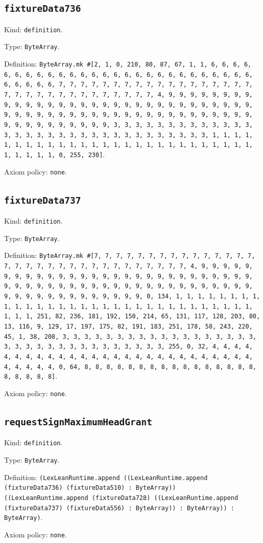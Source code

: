 \documentclass[11pt]{article}
\begin{document}
\subsection*{\texttt{fixtureData736}}
\noindent Kind: \texttt{definition}.\par
\noindent Type: \texttt{ByteArray}.\par
\noindent Definition: \texttt{ByteArray.mk \#[2, 1, 0, 210, 80, 87, 67, 1, 1, 6, 6, 6, 6, 6, 6, 6, 6, 6, 6, 6, 6, 6, 6, 6, 6, 6, 6, 6, 6, 6, 6, 6, 6, 6, 6, 6, 6, 6, 6, 6, 6, 7, 7, 7, 7, 7, 7, 7, 7, 7, 7, 7, 7, 7, 7, 7, 7, 7, 7, 7, 7, 7, 7, 7, 7, 7, 7, 7, 7, 7, 7, 7, 7, 4, 9, 9, 9, 9, 9, 9, 9, 9, 9, 9, 9, 9, 9, 9, 9, 9, 9, 9, 9, 9, 9, 9, 9, 9, 9, 9, 9, 9, 9, 9, 9, 9, 9, 9, 9, 9, 9, 9, 9, 9, 9, 9, 9, 9, 9, 9, 9, 9, 9, 9, 9, 9, 9, 9, 9, 9, 9, 9, 9, 9, 9, 9, 9, 9, 3, 3, 3, 3, 3, 3, 3, 3, 3, 3, 3, 3, 3, 3, 3, 3, 3, 3, 3, 3, 3, 3, 3, 3, 3, 3, 3, 3, 3, 3, 3, 3, 1, 1, 1, 1, 1, 1, 1, 1, 1, 1, 1, 1, 1, 1, 1, 1, 1, 1, 1, 1, 1, 1, 1, 1, 1, 1, 1, 1, 1, 1, 1, 1, 0, 255, 230]}.\par
\noindent Axiom policy: \texttt{none}.\par
\subsection*{\texttt{fixtureData737}}
\noindent Kind: \texttt{definition}.\par
\noindent Type: \texttt{ByteArray}.\par
\noindent Definition: \texttt{ByteArray.mk \#[7, 7, 7, 7, 7, 7, 7, 7, 7, 7, 7, 7, 7, 7, 7, 7, 7, 7, 7, 7, 7, 7, 7, 7, 7, 7, 7, 7, 7, 7, 7, 7, 4, 9, 9, 9, 9, 9, 9, 9, 9, 9, 9, 9, 9, 9, 9, 9, 9, 9, 9, 9, 9, 9, 9, 9, 9, 9, 9, 9, 9, 9, 9, 9, 9, 9, 9, 9, 9, 9, 9, 9, 9, 9, 9, 9, 9, 9, 9, 9, 9, 9, 9, 9, 9, 9, 9, 9, 9, 9, 9, 9, 9, 9, 9, 9, 9, 0, 134, 1, 1, 1, 1, 1, 1, 1, 1, 1, 1, 1, 1, 1, 1, 1, 1, 1, 1, 1, 1, 1, 1, 1, 1, 1, 1, 1, 1, 1, 1, 1, 1, 1, 1, 251, 82, 236, 181, 192, 150, 214, 65, 131, 117, 128, 203, 80, 13, 116, 9, 129, 17, 197, 175, 82, 191, 183, 251, 178, 58, 243, 220, 45, 1, 38, 208, 3, 3, 3, 3, 3, 3, 3, 3, 3, 3, 3, 3, 3, 3, 3, 3, 3, 3, 3, 3, 3, 3, 3, 3, 3, 3, 3, 3, 3, 3, 3, 3, 3, 255, 0, 32, 4, 4, 4, 4, 4, 4, 4, 4, 4, 4, 4, 4, 4, 4, 4, 4, 4, 4, 4, 4, 4, 4, 4, 4, 4, 4, 4, 4, 4, 4, 4, 4, 0, 64, 8, 8, 8, 8, 8, 8, 8, 8, 8, 8, 8, 8, 8, 8, 8, 8, 8, 8, 8, 8, 8]}.\par
\noindent Axiom policy: \texttt{none}.\par
\subsection*{\texttt{requestSignMaximumHeadGrant}}
\noindent Kind: \texttt{definition}.\par
\noindent Type: \texttt{ByteArray}.\par
\noindent Definition: \texttt{(LexLeanRuntime.append ((LexLeanRuntime.append (fixtureData736) (fixtureData510) : ByteArray)) ((LexLeanRuntime.append (fixtureData728) ((LexLeanRuntime.append (fixtureData737) (fixtureData556) : ByteArray)) : ByteArray)) : ByteArray)}.\par
\noindent Axiom policy: \texttt{none}.\par
\end{document}
